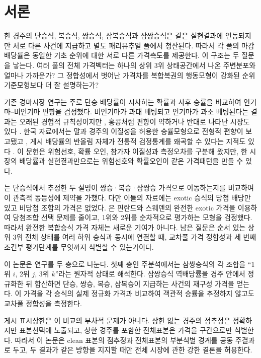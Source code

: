 \section{서론}

한 경주의 단승식, 복승식, 쌍승식, 삼복승식과 삼쌍승식은 같은 실현결과에
연동되지만 서로 다른 사건에 지급하고 별도 패리뮤추얼 풀에서 청산된다. 따라서
각 풀의 마감 배당률은 동일한 기초 순위에 대한 서로 다른 가격측도를 제공한다.
이 구조는 두 질문을 낳는다. 여러 풀의 전체 가격벡터는 하나의 상위 3위
상태공간에서 나온 주변분포와 얼마나 가까운가? 그 정합성에서 벗어난 가격차를
복합복권의 행동모형이 강화된 순위 기준모형보다 더 잘 설명하는가?

기존 경마시장 연구는 주로 단승 배당률이 시사하는 확률과 사후 승률을 비교하여
인기마--비인기마 편향을 검정했다. 비인기마가 과대 베팅되고 인기마가 과소
베팅된다는 결과는 오래된 경험적 규칙성이지만
\citep{griffith1949,weitzman1965,ali1977}, 홍콩처럼 편향이 약하거나 반대로
나타난 시장도 있다 \citep{buschehall1988}. 한국 자료에서는 말과 경주의
이질성을 허용한 승률모형으로 전형적 편향이 보고됐고
\citep{jeongetal2019}, 게시 배당률의 반올림 자체가 전통적 검정통계를
왜곡할 수 있다는 지적도 있다 \citep{wallsbusche2003}. 이 문헌은 위험선호,
확률 오인, 참가자 이질성과 측정오차를 구분해 왔지만, 한 시장의 배당률과
실현결과만으로는 위험선호와 확률오인이 같은 가격패턴을 만들 수 있다.

\citet{snowbergwolfers2010}는 단승식에서 추정한 두 설명이 쌍승·복승·삼쌍승
가격으로 이동하는지를 비교하여 이 관측적 동등성에 제약을 가했다. 다만 이들의
자료에는 exotic 승식의 당첨 배당만 있고 비당첨 조합의 가격은 없었다.
\citet{koivurantakorhonen2019}은 핀란드와 스웨덴의 완전한 exotic 가격을
이용하여 당첨조합 선택 문제를 줄이고, 1위와 2위를 순차적으로 평가하는 모형을
검정했다. 따라서 완전한 복합승식 가격 자체는 새로운 기여가 아니다. 남은
질문은 순서 있는 상위 3위 전체 상태를 여러 하위 승식과 동시에 연결할 때,
교차풀 가격 정합성과 세 번째 조건부 평가단계를 무엇까지 식별할 수 있는가이다.

이 논문은 연구를 두 층으로 나눈다. 첫째 층인 주분석에서는 삼쌍승식의 각
조합을 ``1위 $i$, 2위 $j$, 3위 $k$''라는 원자적 상태로 해석한다. 삼쌍승식
역배당률을 경주 안에서 정규화한 뒤 합산하면 단승, 쌍승, 복승, 삼복승이
지급하는 사건의 재구성 가격을 얻는다. 이 가격을 각 승식의 실제 정규화 가격과
비교하여 객관적 승률을 추정하지 않고도 교차풀 정합성을 측정한다.

게시 표시상한은 이 비교의 부차적 문제가 아니다. 상한 없는 경주의 점추정은
정확하지만 표본선택에 노출되고, 상한 경주를 포함한 전체표본은 가격을 구간으로만
식별한다. 따라서 이 논문은 clean 표본의 점추정과 전체표본의 부분식별 경계를
공동 주결과로 두고, 두 결과가 같은 방향을 지지할 때만 전체 시장에 관한 강한
결론을 허용한다.

